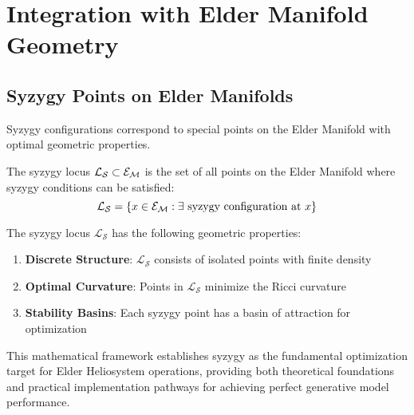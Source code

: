 \section{Integration with Elder Manifold Geometry}

\subsection{Syzygy Points on Elder Manifolds}

Syzygy configurations correspond to special points on the Elder Manifold with optimal geometric properties.

\begin{definition}
The syzygy locus $\mathcal{L}_{\mathcal{S}} \subset \mathcal{E}_{\mathcal{M}}$ is the set of all points on the Elder Manifold where syzygy conditions can be satisfied:
\begin{equation}
\mathcal{L}_{\mathcal{S}} = \{x \in \mathcal{E}_{\mathcal{M}} : \exists \text{ syzygy configuration at } x\}
\end{equation}
\end{definition}

\begin{theorem}
The syzygy locus $\mathcal{L}_{\mathcal{S}}$ has the following geometric properties:
\begin{enumerate}
    \item \textbf{Discrete Structure}: $\mathcal{L}_{\mathcal{S}}$ consists of isolated points with finite density
    \item \textbf{Optimal Curvature}: Points in $\mathcal{L}_{\mathcal{S}}$ minimize the Ricci curvature
    \item \textbf{Stability Basins}: Each syzygy point has a basin of attraction for optimization
\end{enumerate}
\end{theorem}

This mathematical framework establishes syzygy as the fundamental optimization target for Elder Heliosystem operations, providing both theoretical foundations and practical implementation pathways for achieving perfect generative model performance.